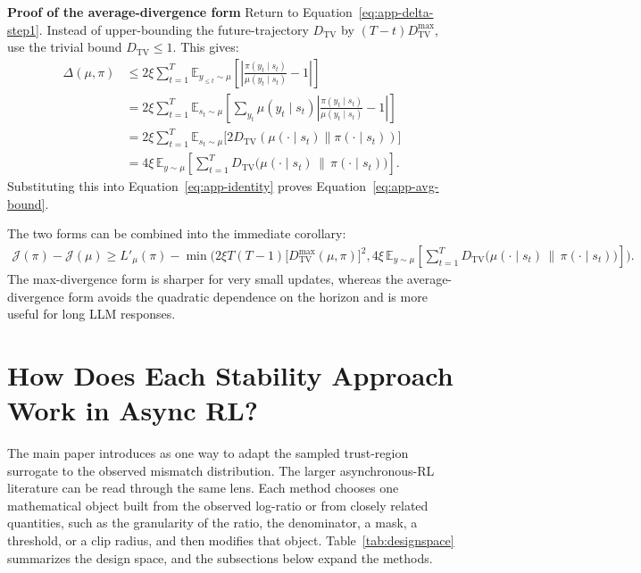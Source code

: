 \textbf{Proof of the average-divergence form}
Return to Equation~\eqref{eq:app-delta-step1}. Instead of upper-bounding the future-trajectory $D_{\mathrm{TV}}$ by $(T-t)D_{\mathrm{TV}}^{\max}$, use the trivial bound $D_{\mathrm{TV}}\le 1$. This gives:
\begin{align*}
\Delta(\mu,\pi)
&\le 2\xi\sum_{t=1}^{T}\mathbb E_{y_{\le t}\sim\mu}\left[
\left|\frac{\pi(y_t\mid s_t)}{\mu(y_t\mid s_t)}-1\right|
\right]\\
&=2\xi\sum_{t=1}^{T}\mathbb E_{s_t\sim\mu}\left[
\sum_{y_t}\mu(y_t\mid s_t)
\left|\frac{\pi(y_t\mid s_t)}{\mu(y_t\mid s_t)}-1\right|
\right]\\
&=2\xi\sum_{t=1}^{T}\mathbb E_{s_t\sim\mu}\Big[2D_{\mathrm{TV}}(\mu(\cdot\mid s_t)\|\pi(\cdot\mid s_t))\Big]\\
&=4\xi\,\mathbb E_{y\sim\mu}\left[\sum_{t=1}^{T}D_{\mathrm{TV}}\bigl(\mu(\cdot\mid s_t)\,\|\,\pi(\cdot\mid s_t)\bigr)\right].
\end{align*}
Substituting this into Equation~\eqref{eq:app-identity} proves Equation~\eqref{eq:app-avg-bound}.


The two forms can be combined into the immediate corollary:
\begin{align}
\mathcal J(\pi)-\mathcal J(\mu)
\ge L'_{\mu}(\pi)-\min\Bigg(
2\xi T(T-1)\bigl[D_{\mathrm{TV}}^{\max}(\mu,\pi)\bigr]^2,
4\xi\,\mathbb E_{y\sim\mu}\left[\sum_{t=1}^{T}D_{\mathrm{TV}}\bigl(\mu(\cdot\mid s_t)\,\|\,\pi(\cdot\mid s_t)\bigr)\right]
\Bigg).
\label{eq:app-composite}
\end{align}
The max-divergence form is sharper for very small updates, whereas the average-divergence form avoids the quadratic dependence on the horizon and is more useful for long LLM responses.

\section{How Does Each Stability Approach Work in Async RL?}
\label{app:stabilizers}

The main paper introduces \satr{} as one way to adapt the sampled trust-region surrogate to the observed mismatch distribution. The larger asynchronous-RL literature can be read through the same lens. Each method chooses one mathematical object built from the observed log-ratio or from closely related quantities, such as the granularity of the ratio, the denominator, a mask, a threshold, or a clip radius, and then modifies that object. Table~\ref{tab:designspace} summarizes the design space, and the subsections below expand the methods.

